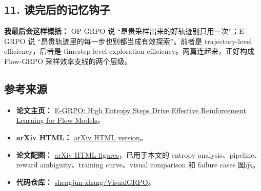 \subsection{11. 读完后的记忆钩子}

\begin{summarybox}
\textbf{我最后会这样概括：} OP-GRPO 说 ``昂贵采样出来的好轨迹别只用一次''；E-GRPO 说 ``昂贵轨迹里的每一步也别都当成有效探索''。前者是 trajectory-level efficiency，后者是 timestep-level exploration efficiency。两篇连起来，正好构成 Flow-GRPO 采样效率支线的两个层级。
\end{summarybox}

\subsection{参考来源}

\begin{itemize}[leftmargin=1.5em]
  \item \textbf{论文主页：} \href{https://arxiv.org/abs/2601.00423}{E-GRPO: High Entropy Steps Drive Effective Reinforcement Learning for Flow Models}。
  \item \textbf{arXiv HTML：} \href{https://arxiv.org/html/2601.00423v1}{arXiv HTML version}。
  \item \textbf{论文配图：} \href{https://arxiv.org/html/2601.00423v1}{arXiv HTML figures}，已用于本文的 entropy analysis、pipeline、reward ambiguity、training curve、visual comparison 和 failure cases 图示。
  \item \textbf{代码仓库：} \href{https://github.com/shengjun-zhang/VisualGRPO}{shengjun-zhang/VisualGRPO}。
\end{itemize}
